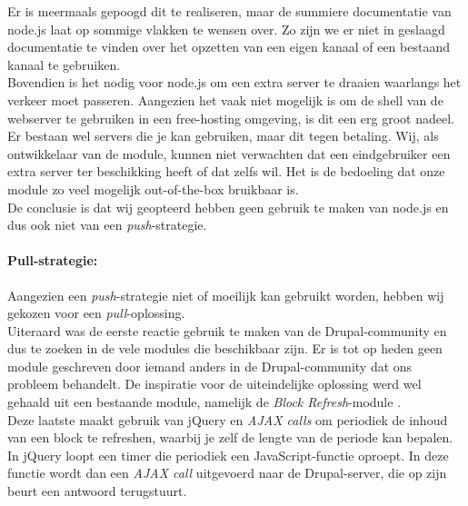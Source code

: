 Er is meermaals gepoogd dit te realiseren, maar de summiere documentatie van node.js laat op sommige vlakken te wensen over. Zo zijn we er niet in geslaagd documentatie te vinden over het opzetten van een eigen kanaal of een bestaand kanaal te gebruiken.\\
Bovendien is het nodig voor node.js om een extra server te draaien waarlangs het verkeer moet passeren. Aangezien het vaak niet mogelijk is om de shell van de webserver te gebruiken in een free-hosting omgeving, is dit een erg groot nadeel. Er bestaan wel servers die je kan gebruiken, maar dit tegen betaling. Wij, als ontwikkelaar van de module, kunnen niet verwachten dat een eindgebruiker een extra server ter beschikking heeft of dat zelfs wil. Het is de bedoeling dat onze module zo veel mogelijk out-of-the-box bruikbaar is.\\

De conclusie is dat wij geopteerd hebben geen gebruik te maken van node.js en dus ook niet van een \textit{push}-strategie.

\paragraph{Pull-strategie: }

Aangezien een \textit{push}-strategie niet of moeilijk kan gebruikt worden, hebben wij gekozen voor een \textit{pull}-oplossing.\\

Uiteraard was de eerste reactie gebruik te maken van de Drupal-community en dus te zoeken in de vele modules die beschikbaar zijn. Er is tot op heden geen module geschreven door iemand anders in de Drupal-community dat ons probleem behandelt. De inspiratie voor de uiteindelijke oplossing werd wel gehaald uit een bestaande module, namelijk de \textit{Block Refresh}-module \cite{blockRefreshModule}.\\
Deze laatste maakt gebruik van jQuery en \textit{AJAX calls} om periodiek de inhoud van een block te refreshen, waarbij je zelf de lengte van de periode kan bepalen. In jQuery loopt een timer die periodiek een JavaScript-functie oproept. In deze functie wordt dan een \textit{AJAX call} uitgevoerd naar de Drupal-server, die op zijn beurt een antwoord terugstuurt.\\

